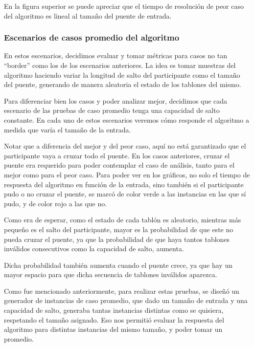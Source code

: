 \documentclass[10pt,a4paper]{article}
\begin{document}
En la figura superior se puede apreciar que el tiempo de resolución de peor caso del algoritmo es lineal al tamaño del puente de entrada.

\subsubsection{Escenarios de casos promedio del algoritmo}

\noindent En estos escenarios, decidimos evaluar y tomar métricas para casos no tan “border”  como los de los escenarios anteriores. La idea es tomar muestras del algoritmo haciendo variar la longitud de salto del participante como el tamaño del puente, generando de manera aleatoria el estado de los tablones del mismo.

\noindent Para diferenciar bien los casos y poder analizar mejor, decidimos que cada escenario de las pruebas de caso promedio tenga una capacidad de salto constante. En cada uno de estos escenarios veremos cómo responde el algoritmo a medida que varía el tamaño de la entrada.

\noindent Notar que a diferencia  del mejor y del peor caso, aquí no está garantizado que el participante vaya a cruzar todo el puente. En los casos anteriores, cruzar el puente era requerido para poder contemplar el caso de análisis, tanto para el mejor como para el peor caso. Para poder ver en los gráficos, no solo el tiempo de respuesta del algoritmo en función de la entrada, sino también si el participante pudo o no cruzar el puente, se marcó de color verde a las instancias en las que sí pudo, y de color rojo a las que no.

\noindent Como era de esperar, como el estado de cada tablón es aleatorio, mientras más pequeño es el salto del participante, mayor es la probabilidad de que este no pueda cruzar el puente, ya que la probabilidad de que haya tantos tablones inválidos consecutivos como la capacidad de salto, aumenta.

\noindent Dicha probabilidad también aumenta cuando el puente crece, ya que hay un mayor espacio para que dicha secuencia de tablones inválidos aparezca.

\noindent Como fue mencionado anteriormente, para realizar estas pruebas, se diseñó un generador de instancias de caso promedio, que dado un tamaño de entrada y una capacidad de salto, generaba tantas instancias distintas como se quisiera, respetando el tamaño asignado. Eso nos permitió evaluar la respuesta del algoritmo para distintas instancias del mismo tamaño, y poder tomar un promedio.
\end{document}
